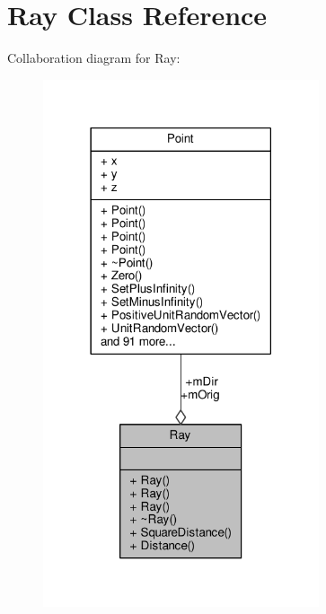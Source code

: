 \hypertarget{classRay}{}\section{Ray Class Reference}
\label{classRay}


Collaboration diagram for Ray\+:
\nopagebreak
\begin{figure}[H]
\begin{center}
\leavevmode
\includegraphics[width=230pt]{db/d2b/classRay__coll__graph}
\end{center}
\end{figure}
